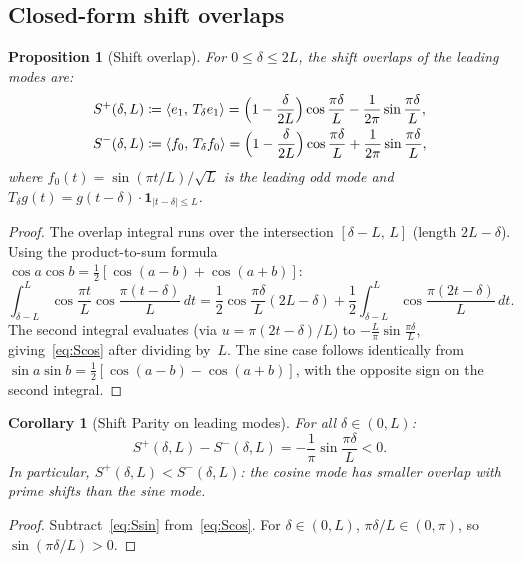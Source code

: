 \documentclass[12pt,a4paper]{article}
\newtheorem{proposition}[theorem]{Proposition}
\newtheorem{corollary}[theorem]{Corollary}
\theoremstyle{definition}
\theoremstyle{remark}
\begin{document}
\subsection{Closed-form shift overlaps}

\begin{proposition}[Shift overlap]
\label{prop:overlap-closed}
For $0 \leq \delta \leq 2L$, the shift overlaps of the leading modes are:
\begin{align}
  S^+(\delta, L) &\coloneqq \langle e_1,\, T_\delta e_1\rangle = \Bigl(1 - \frac{\delta}{2L}\Bigr)\cos\frac{\pi\delta}{L} - \frac{1}{2\pi}\sin\frac{\pi\delta}{L}, \label{eq:Scos} \\
  S^-(\delta, L) &\coloneqq \langle f_0,\, T_\delta f_0\rangle = \Bigl(1 - \frac{\delta}{2L}\Bigr)\cos\frac{\pi\delta}{L} + \frac{1}{2\pi}\sin\frac{\pi\delta}{L}, \label{eq:Ssin}
\end{align}
where $f_0(t) = \sin(\pi t/L)/\sqrt{L}$ is the leading odd mode and $T_\delta g(t) = g(t - \delta)\cdot\mathbf{1}_{|t-\delta|\leq L}$.
\end{proposition}

\begin{proof}
The overlap integral runs over the intersection $[\delta - L,\,L]$ (length $2L - \delta$). Using the product-to-sum formula $\cos a\cos b = \tfrac{1}{2}[\cos(a-b) + \cos(a+b)]$:
\[
  \int_{\delta-L}^{L} \cos\frac{\pi t}{L}\cos\frac{\pi(t-\delta)}{L}\,dt
  = \frac{1}{2}\cos\frac{\pi\delta}{L}(2L - \delta) + \frac{1}{2}\int_{\delta-L}^{L}\cos\frac{\pi(2t-\delta)}{L}\,dt.
\]
The second integral evaluates (via $u = \pi(2t-\delta)/L$) to $-\frac{L}{\pi}\sin\frac{\pi\delta}{L}$, giving~\eqref{eq:Scos} after dividing by~$L$. The sine case follows identically from $\sin a\sin b = \tfrac{1}{2}[\cos(a-b) - \cos(a+b)]$, with the opposite sign on the second integral.
\end{proof}

\begin{corollary}[Shift Parity on leading modes]
\label{cor:diagonal-parity}
For all $\delta \in (0, L)$:
\begin{equation}
\label{eq:parity-diff}
  S^+(\delta, L) - S^-(\delta, L) = -\frac{1}{\pi}\sin\frac{\pi\delta}{L} < 0.
\end{equation}
In particular, $S^+(\delta, L) < S^-(\delta, L)$: the cosine mode has \emph{smaller} overlap with prime shifts than the sine mode.
\end{corollary}

\begin{proof}
Subtract~\eqref{eq:Ssin} from~\eqref{eq:Scos}. For $\delta \in (0, L)$, $\pi\delta/L \in (0, \pi)$, so $\sin(\pi\delta/L) > 0$.
\end{proof}
\end{document}
